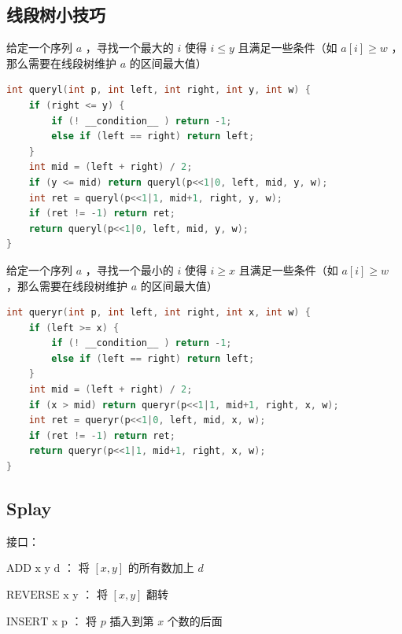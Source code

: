 \documentclass{article}
\begin{document}
\subsection{线段树小技巧}
给定一个序列 $a$ ，寻找一个最大的 $i$ 使得 $i \leq y$ 且满足一些条件（如 $a[i] \geq w$ ，那么需要在线段树维护 $a$ 的区间最大值）
\begin{lstlisting}[language=C++]
int queryl(int p, int left, int right, int y, int w) {
	if (right <= y) {
		if (! __condition__ ) return -1;
		else if (left == right) return left;
	}
	int mid = (left + right) / 2;
	if (y <= mid) return queryl(p<<1|0, left, mid, y, w);
	int ret = queryl(p<<1|1, mid+1, right, y, w);
	if (ret != -1) return ret;
	return queryl(p<<1|0, left, mid, y, w);
}
\end{lstlisting}
给定一个序列 $a$ ，寻找一个最小的 $i$ 使得 $i \geq x$ 且满足一些条件（如 $a[i] \geq w$ ，那么需要在线段树维护 $a$ 的区间最大值）
\begin{lstlisting}[language=C++]
int queryr(int p, int left, int right, int x, int w) {
	if (left >= x) {
		if (! __condition__ ) return -1;
		else if (left == right) return left;
	}
	int mid = (left + right) / 2;
	if (x > mid) return queryr(p<<1|1, mid+1, right, x, w);
	int ret = queryr(p<<1|0, left, mid, x, w);
	if (ret != -1) return ret;
	return queryr(p<<1|1, mid+1, right, x, w);
}
\end{lstlisting}
\subsection{Splay}
接口： 

$\text{ADD x y d}$ ： 将 $[x, y]$ 的所有数加上 $d$ 

$\text{REVERSE x y}$ ： 将 $[x, y]$ 翻转 

$\text{INSERT x p}$ ： 将 $p$ 插入到第 $x$ 个数的后面 
\end{document}
